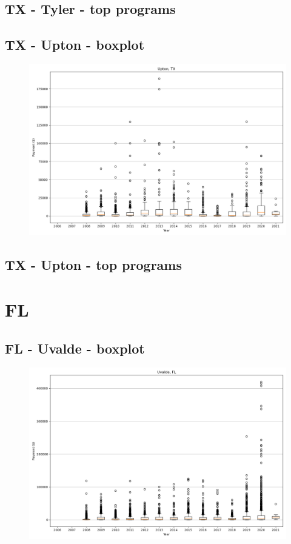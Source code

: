 \subsection*{TX - Tyler - top programs}

\newpage
\subsection*{TX - Upton - boxplot}
\begin{figure}[h]
\centering
\includegraphics[width=7in]{../output/boxplots/counties/Upton-TX_boxplot.png}
\end{figure}


\subsection*{TX - Upton - top programs}

\newpage
\section*{FL}
\subsection*{FL - Uvalde - boxplot}
\begin{figure}[h]
\centering
\includegraphics[width=7in]{../output/boxplots/counties/Uvalde-FL_boxplot.png}
\end{figure}


